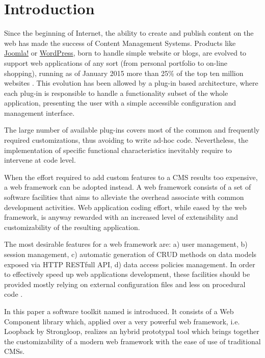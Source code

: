 \section{Introduction}\label{sec:introduction}

Since the beginning of Internet, the ability to create and publish content on the web has made the success of Content Management Systems. Products like \href{http://www.joomla.org/}{Joomla!} or \href{https://wordpress.org/}{WordPress}, born to handle simple website or blogs, are evolved to support web applications of any sort (from personal portfolio to on-line shopping), running as of January 2015 more than 25\% of the top ten million websites \cite{usage-cms}. This evolution has been allowed by a plug-in based architecture, where each plug-in is responsible to handle a functionality subset of the whole application, presenting the user with a simple accessible configuration and management interface.

The large number of available plug-ins covers most of the common and frequently required customizations, thus avoiding to write ad-hoc code. Nevertheless, the implementation of specific functional characteristics inevitably require to intervene at code level.

When the effort required to add custom features to a CMS results too expensive, a web framework can be adopted instead. A web framework consists of a set of software facilities that aims to alleviate the overhead associate with common development activities. Web application coding effort, while eased by the web framework, is anyway rewarded with an increased level of extensibility and customizability of the resulting application.

The most desirable features for a web framework are: a) user management, b) session management, c) automatic generation of CRUD methods on data models exposed via HTTP RESTfull API, d) data access policies management. In order to effectively speed up web applications development, these facilities should be provided mostly relying on external configuration files and less on procedural code \cite{6859693}.

In this paper a software toolkit named  is introduced. It consists of a Web Component library which, applied over a very powerful web framework, i.e. Loopback by Strongloop, realizes an hybrid prototypal tool which brings together the customizability of a modern web framework with the ease of use of traditional CMSs.

